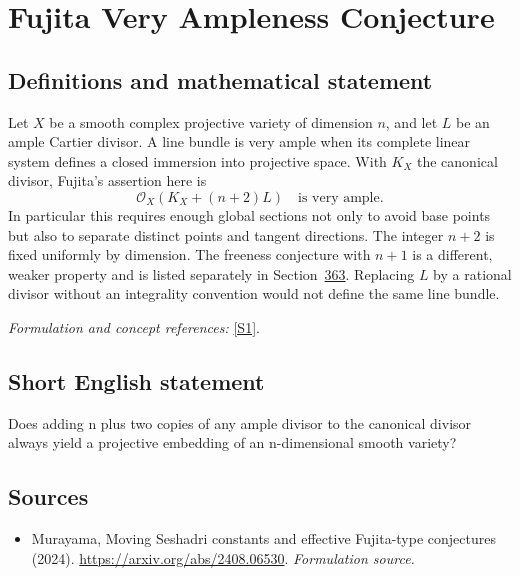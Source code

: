 \documentclass[11pt]{article}
\begin{document}
\section*{\texorpdfstring{Fujita Very Ampleness Conjecture}{Fujita Very Ampleness Conjecture}}\label{30006956}
\subsection{Definitions and mathematical statement}
Let $X$ be a smooth complex projective variety of dimension $n$, and let $L$ be an ample Cartier divisor. A line bundle is very ample when its complete linear system defines a closed immersion into projective space. With $K_X$ the canonical divisor, Fujita's assertion here is
\[
 \mathcal O_X(K_X+(n+2)L)\quad\text{is very ample}.
\]
In particular this requires enough global sections not only to avoid base points but also to separate distinct points and tangent directions. The integer $n+2$ is fixed uniformly by dimension. The freeness conjecture with $n+1$ is a different, weaker property and is listed separately in Section~\href{https://mehmetmars7.github.io/Erdosproblems-llm-hunter/problem.html?type=open_problems&id=problem.fujita-freeness-conjecture}{363}. Replacing $L$ by a rational divisor without an integrality convention would not define the same line bundle.
\par\smallskip\textit{Formulation and concept references:} \href{https://arxiv.org/abs/2408.06530}{[S1]}.

\subsection{Short English statement}
Does adding n plus two copies of any ample divisor to the canonical divisor always yield a projective embedding of an n-dimensional smooth variety?
\subsection{Sources}
\begin{itemize}
\item[S1]Murayama, Moving Seshadri constants and effective Fujita-type conjectures (2024).
\url{https://arxiv.org/abs/2408.06530}.
\textit{Formulation source.}
\end{itemize}
\end{document}
